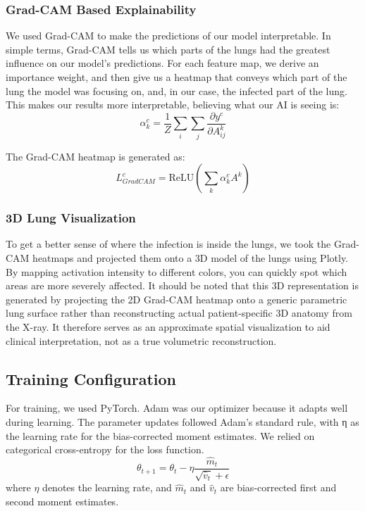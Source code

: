 \documentclass[conference]{IEEEtran}
\begin{document}
\subsubsection{Grad-CAM Based Explainability}

We used Grad-CAM to make the predictions of our model interpretable. In simple terms, Grad-CAM tells us which parts of the lungs had the greatest influence on our model's predictions. For each feature map, we derive an importance weight, and then give us a heatmap that conveys which part of the lung the model was focusing on, and, in our case, the infected part of the lung. This makes our results more interpretable, believing what our AI is seeing is:
\begin{equation}
\alpha_k^c = \frac{1}{Z} \sum_{i}\sum_{j} \frac{\partial y^c}{\partial A_{ij}^k}
\end{equation}

The Grad-CAM heatmap is generated as:
\begin{equation}
L_{GradCAM}^c = \text{ReLU}\left(\sum_k \alpha_k^c A^k\right)
\end{equation}


\subsubsection{3D Lung Visualization}

To get a better sense of where the infection is inside the lungs, we took the Grad-CAM heatmaps and projected them onto a 3D model of the lungs using Plotly. By mapping activation intensity to different colors, you can quickly spot which areas are more severely affected. It should be noted that this 3D representation is generated by projecting the 2D Grad-CAM heatmap onto a generic parametric lung surface rather than reconstructing actual patient-specific 3D anatomy from the X-ray. It therefore serves as an approximate spatial visualization to aid clinical interpretation, not as a true volumetric reconstruction.


\subsection{Training Configuration}
For training, we used PyTorch. Adam was our optimizer because it adapts well during learning. The parameter updates followed Adam's standard rule, with η as the learning rate for the bias-corrected moment estimates. We relied on categorical cross-entropy for the loss function.
\begin{equation}
\theta_{t+1} = \theta_t - \eta \frac{\hat{m}_t}{\sqrt{\hat{v}_t} + \epsilon}
\end{equation}
where \( \eta \) denotes the learning rate, and \( \hat{m}_t \) and \( \hat{v}_t \) are bias-corrected first and second moment estimates.
\end{document}
